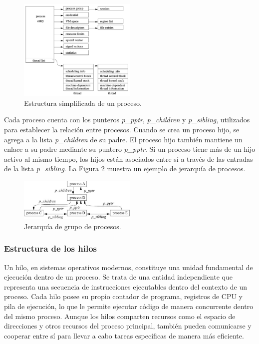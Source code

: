 \begin{figure}[H]
    \centering
    \includegraphics[width=0.5\textwidth]{./images/processStructure.png}
    \caption{Estructura simplificada de un proceso.}
    \label{fig:process-state}
\end{figure}

Cada proceso cuenta con los punteros \textit{p\_pptr}, \textit{p\_children} y \textit{p\_sibling}, utilizados para establecer la relación entre procesos. Cuando se crea un proceso hijo, se agrega a la lista \textit{p\_children} de su padre. El proceso hijo también mantiene un enlace a su padre mediante su puntero \textit{p\_pptr}. Si un proceso tiene más de un hijo activo al mismo tiempo, los hijos están asociados entre sí a través de las entradas de la lista \textit{p\_sibling}. La Figura \ref{fig:process-hierarchy} muestra un ejemplo de jerarquía de procesos.

\begin{figure}[H]
    \centering
    \includegraphics[width=0.5\textwidth]{./images/process-hierarchy.jpeg}
    \caption{Jerarquía de grupo de procesos.}
    \label{fig:process-hierarchy}
\end{figure}


\subsubsection{Estructura de los hilos}
Un hilo, en sistemas operativos modernos, constituye una unidad fundamental de ejecución dentro de un proceso. Se trata de una entidad independiente que representa una secuencia de instrucciones ejecutables dentro del contexto de un proceso. Cada hilo posee su propio contador de programa, registros de CPU y pila de ejecución, lo que le permite ejecutar código de manera concurrente dentro del mismo proceso. Aunque los hilos comparten recursos como el espacio de direcciones y otros recursos del proceso principal, también pueden comunicarse y cooperar entre sí para llevar a cabo tareas específicas de manera más eficiente.\par

